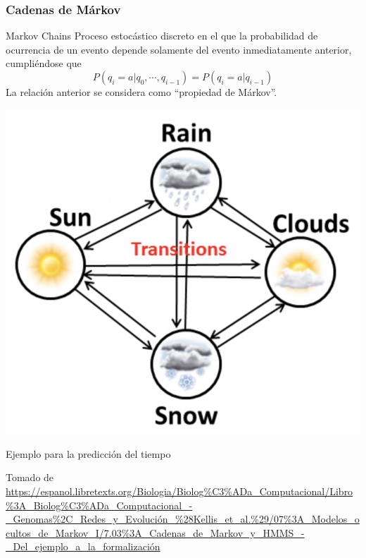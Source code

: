 \documentclass[
10pt, %
aspectratio=169, %
]{beamer}
\begin{document}
	\begin{frame}
		
		\frametitle{Cadenas de Márkov} 
		
		\begin{alertblock}{Markov Chains}
			Proceso estocástico discreto en el que la probabilidad de ocurrencia de un evento depende solamente del evento inmediatamente anterior, cumpliéndose que 
			$$P(q_i = a | q_0, \cdots, q_{i-1}) = P(q_i = a | q_{i-1})$$
			La relación anterior se considera como ``propiedad de Márkov''.
		\end{alertblock}
		
		\pause 
		\noindent\begin{minipage}{.4\textwidth}
			\centering	
			\includegraphics[scale=0.35]{cadena_markov.png} 
		\end{minipage}%
		\begin{minipage}{.6\textwidth}
			\vspace{2\baselineskip}
			
			Ejemplo para la predicción del tiempo 
			
			{\scriptsize Tomado de \url{https://espanol.libretexts.org/Biologia/Biolog\%C3\%ADa\_Computacional/Libro\%3A\_Biolog\%C3\%ADa\_Computacional\_-\_Genomas\%2C\_Redes\_y\_Evolución\_\%28Kellis\_et\_al.\%29/07\%3A\_Modelos\_ocultos\_de\_Markov\_I/7.03\%3A\_Cadenas\_de\_Markov\_y\_HMMS\_-\_Del\_ejemplo\_a\_la\_formalización}}
		\end{minipage}
		
	\end{frame}
	
\end{document}
